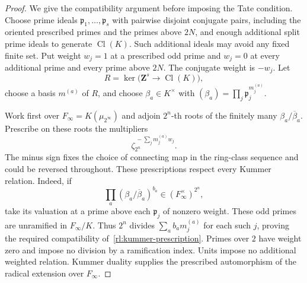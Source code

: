 \begin{proof}
We give the compatibility argument before imposing the Tate condition.
Choose prime ideals $\mathfrak p_1,\ldots,\mathfrak p_s$ with pairwise
disjoint conjugate pairs, including the oriented prescribed primes and
the primes above $2N$, and enough additional split prime ideals to
generate $\operatorname{Cl}(K)$.  Such additional ideals may avoid any
fixed finite set.  Put weight $w_j=1$ at a prescribed odd prime and
$w_j=0$ at every additional prime and every prime above $2N$.
The conjugate weight is $-w_j$.  Let
\[
 R=\ker\bigl(\mathbf Z^s\longrightarrow\operatorname{Cl}(K)\bigr),
\]
choose a basis $m^{(a)}$ of $R$, and choose $\beta_a\in K^\times$ with
$(\beta_a)=\prod_j\mathfrak p_j^{m_j^{(a)}}$.

Work first over $F_\infty=K(\mu_{2^\infty})$ and adjoin $2^n$-th roots
of the finitely many $\beta_a/\overline\beta_a$.  Prescribe on these
roots the multipliers
\begin{equation}\label{rl:kummer-prescription}
 \zeta_{2^n}^{\,-\sum_j m_j^{(a)}w_j}.
\end{equation}
The minus sign fixes the choice of connecting map in the ring-class
sequence and could be reversed throughout.  These prescriptions respect
every Kummer relation.  Indeed, if
\[
 \prod_a(\beta_a/\overline\beta_a)^{b_a}
                         \in(F_\infty^\times)^{2^n},
\]
take its valuation at a prime above each $\mathfrak p_j$ of nonzero
weight.  These odd primes are unramified in $F_\infty/K$.  Thus
$2^n$ divides $\sum_a b_am_j^{(a)}$ for each such $j$, proving the
required compatibility of~\eqref{rl:kummer-prescription}.  Primes over
$2$ have weight zero and impose no division by a ramification index.
Units impose no additional weighted relation.  Kummer duality supplies
the prescribed automorphism of the radical extension over $F_\infty$.


\end{proof}
